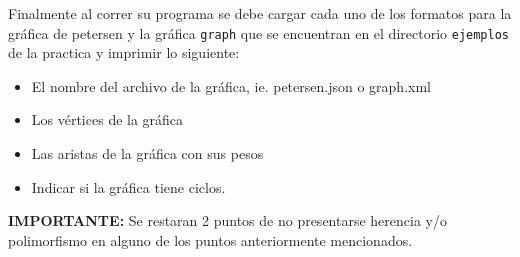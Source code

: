 \documentclass{article}
\begin{document}
\begin{enumerate}
   Finalmente al correr su programa se debe cargar cada uno de los formatos para la gráfica de petersen y la gráfica \texttt{graph} que se encuentran en el directorio \texttt{ejemplos} de la practica y imprimir lo siguiente:
   
   \begin{itemize}
   \item El nombre del archivo de la gráfica, ie. petersen.json o graph.xml
   \item Los vértices de la gráfica
   \item Las aristas de la gráfica con sus pesos
   \item Indicar si la gráfica tiene ciclos.
   \end{itemize}

 \textbf{IMPORTANTE:} Se restaran 2 puntos de no presentarse herencia y/o polimorfismo en alguno de los puntos anteriormente mencionados.

\end{enumerate}
\end{document}
